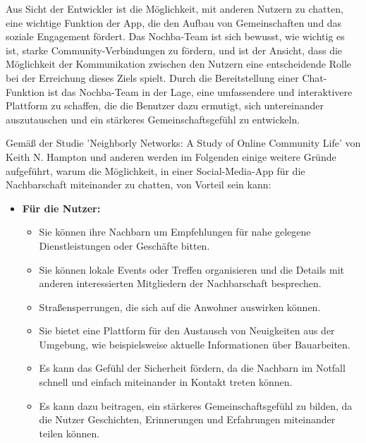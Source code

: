Aus Sicht der Entwickler ist die Möglichkeit, mit anderen Nutzern zu chatten, eine wichtige Funktion der App, die den Aufbau von Gemeinschaften und das soziale Engagement fördert. Das Nochba-Team ist sich bewusst, wie wichtig es ist, starke Community-Verbindungen zu fördern, und ist der Ansicht, dass die Möglichkeit der Kommunikation zwischen den Nutzern eine entscheidende Rolle bei der Erreichung dieses Ziels spielt. Durch die Bereitstellung einer Chat-Funktion ist das Nochba-Team in der Lage, eine umfassendere und interaktivere Plattform zu schaffen, die die Benutzer dazu ermutigt, sich untereinander auszutauschen und ein stärkeres Gemeinschaftsgefühl zu entwickeln.

Gemäß der Studie 'Neighborly Networks: A Study of Online Community Life' von Keith N. Hampton und anderen werden im Folgenden einige weitere Gründe aufgeführt, warum die Möglichkeit, in einer Social-Media-App für die Nachbarschaft miteinander zu chatten, von Vorteil sein kann:

\begin{itemize}
  \item \textbf{Für die Nutzer:}
        \begin{itemize}
          \item {Sie können ihre Nachbarn um Empfehlungen für nahe gelegene Dienstleistungen oder Geschäfte bitten.}
          \item {Sie können lokale Events oder Treffen organisieren und die Details mit anderen interessierten Mitgliedern der Nachbarschaft besprechen.}
          \item {Straßensperrungen, die sich auf die Anwohner auswirken können.}
          \item {Sie bietet eine Plattform für den Austausch von Neuigkeiten aus der Umgebung, wie beispielsweise aktuelle Informationen über Bauarbeiten.}
          \item {Es kann das Gefühl der Sicherheit fördern, da die Nachbarn im Notfall schnell und einfach miteinander in Kontakt treten können.}
          \item {Es kann dazu beitragen, ein stärkeres Gemeinschaftsgefühl zu bilden, da die Nutzer Geschichten, Erinnerungen und Erfahrungen miteinander teilen können.}
        \end{itemize}
\end{itemize}


